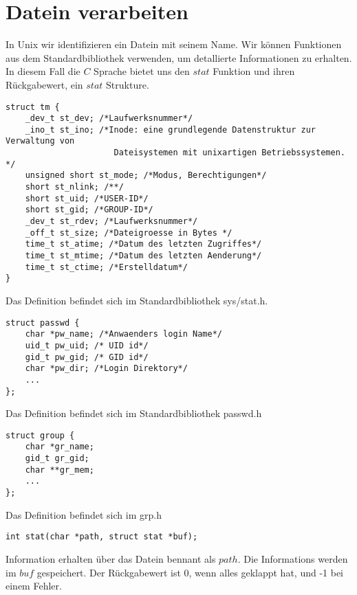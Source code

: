\documentclass{article}[12pt]
\newenvironment{myexampleblock}[1]{%
    \tcolorbox[beamer,%
    noparskip,breakable,
    colback=White,colframe=ForestGreen,%
    colbacklower=LimeGreen!75!White,%
    title=#1]}%
    {\endtcolorbox}
\begin{document}
\section{Datein verarbeiten}
In Unix wir identifizieren ein Datein mit seinem Name. Wir können Funktionen aus dem Standardbibliothek verwenden, um
detallierte Informationen zu erhalten. In diesem Fall die $C$ Sprache bietet uns den $stat$ Funktion und ihren Rückgabewert,
ein $stat$ Strukture. 
\begin{myexampleblock}{Definition: \texttt{struct stat}}
\begin{lstlisting}
struct tm {
    _dev_t st_dev; /*Laufwerksnummer*/
    _ino_t st_ino; /*Inode: eine grundlegende Datenstruktur zur Verwaltung von
                      Dateisystemen mit unixartigen Betriebssystemen. */
    unsigned short st_mode; /*Modus, Berechtigungen*/
    short st_nlink; /**/
    short st_uid; /*USER-ID*/
    short st_gid; /*GROUP-ID*/
    _dev_t st_rdev; /*Laufwerksnummer*/
    _off_t st_size; /*Dateigroesse in Bytes */
    time_t st_atime; /*Datum des letzten Zugriffes*/
    time_t st_mtime; /*Datum des letzten Aenderung*/
    time_t st_ctime; /*Erstelldatum*/
}
\end{lstlisting}
\vspace{-0.4cm}
Das Definition befindet sich im Standardbibliothek sys/stat.h.
\end{myexampleblock}
\begin{myexampleblock}{Definition: \texttt{struct passwd}}
\begin{lstlisting}
struct passwd {
    char *pw_name; /*Anwaenders login Name*/
    uid_t pw_uid; /* UID id*/
    gid_t pw_gid; /* GID id*/
    char *pw_dir; /*Login Direktory*/
    ...
};
\end{lstlisting}
\vspace{-0.4cm}
Das Definition befindet sich im Standardbibliothek passwd.h
\end{myexampleblock}
\begin{myexampleblock}{Definition: \texttt{struct group}}
\begin{lstlisting}
struct group {
    char *gr_name;
    gid_t gr_gid;
    char **gr_mem;
    ...
};
\end{lstlisting}
\vspace{-0.4cm}
Das Definition befindet sich im grp.h
\end{myexampleblock}
\begin{myexampleblock}{Funktion: \texttt{stat}}
\begin{lstlisting}
int stat(char *path, struct stat *buf);
\end{lstlisting}
\vspace{-.4cm}
Information erhalten über das Datein bennant als $path$. Die Informations werden im $buf$ gespeichert.
Der Rückgabewert ist 0, wenn alles geklappt hat, und -1 bei einem Fehler.
\end{myexampleblock}
\end{document}
